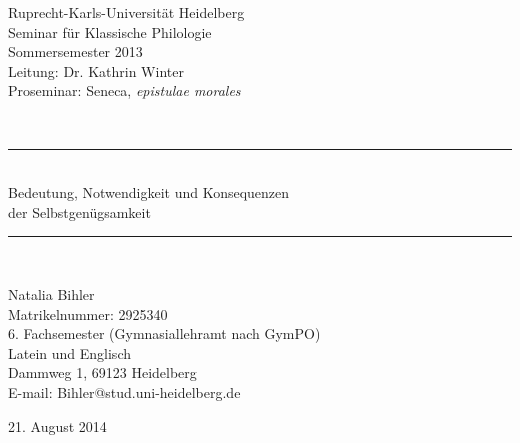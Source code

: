 \begin{titlepage}

\begin{center}


\begin{minipage}{0.55\textwidth}
\begin{flushleft} \small
Ruprecht-Karls-Universität Heidelberg\\
Seminar für Klassische Philologie\\
Sommersemester 2013\\
Leitung: Dr. Kathrin Winter\\ 
Proseminar: Seneca, \textit{epistulae morales}
\end{flushleft}
\end{minipage}
\begin{minipage}{0.4\textwidth}
\begin{flushright} \large

\end{flushright}
\end{minipage}
\\[3.3cm]
\rule{\textwidth}{0.4pt}\\[0.4cm]


{\Large Bedeutung, Notwendigkeit und Konsequenzen \\ der Selbstgenügsamkeit} \\[0.2cm]

\rule{\textwidth}{0.4pt}\\[2.4cm]

\begin{flushleft} \small
Natalia Bihler\\
Matrikelnummer: 2925340\\
6. Fachsemester (Gymnasiallehramt nach GymPO)\\
Latein und Englisch\\
Dammweg 1, 69123 Heidelberg\\
E-mail: Bihler@stud.uni-heidelberg.de
\end{flushleft}


\vfill

{\large 21. August 2014}

\end{center}

\end{titlepage}